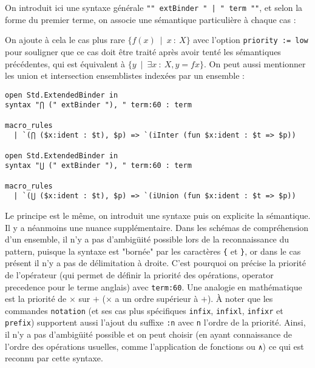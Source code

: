 \documentclass[a4paper, 12pt]{article}
\newcommand{\lean}[1]{\texttt{#1}}
\begin{document}
On introduit ici une syntaxe générale \lean{"{" extBinder " | " term "}"}, et selon la forme du premier terme, on associe une sémantique particulière à chaque cas :

On ajoute à cela le cas plus rare $\{f(x)\ \mid\ x\ :\ X\}$ avec l'option \lean{priority := low} pour souligner que ce cas doit être traité après avoir tenté les sémantiques précédentes, qui est équivalent à $\{y\ \mid\ \exists x\ :\ X, y = f x\}$. On peut aussi mentionner les union et intersection ensemblistes indexées par un ensemble :

\begin{verbatim}
open Std.ExtendedBinder in
syntax "⋂ (" extBinder "), " term:60 : term

macro_rules
  | `(⋂ ($x:ident : $t), $p) => `(iInter (fun $x:ident : $t => $p))

open Std.ExtendedBinder in
syntax "⋃ (" extBinder "), " term:60 : term

macro_rules
  | `(⋃ ($x:ident : $t), $p) => `(iUnion (fun $x:ident : $t => $p))
\end{verbatim}

Le principe est le même, on introduit une syntaxe puis on explicite la sémantique. Il y a néanmoins une nuance supplémentaire. Dans les schémas de compréhension d'un ensemble, il n'y a pas d'ambigüité possible lors de la reconnaissance du pattern, puisque la syntaxe est "bornée" par les caractères \lean{\{} et \lean{\}}, or dans le cas présent il n'y a pas de délimitation à droite. C'est pourquoi on précise la priorité de l'opérateur (qui permet de définir la priorité des opérations, operator precedence pour le terme anglais) avec \lean{term:60}. Une analogie en mathématique est la priorité de $\times$ sur $+$ ($\times$ a un ordre supérieur à $+$). À noter que les commandes \lean{notation} (et ses cas plus spécifiques \lean{infix}, \lean{infixl}, \lean{infixr} et \lean{prefix}) supportent aussi l'ajout du suffixe \lean{:n} avec \lean{n} l'ordre de la priorité. Ainsi, il n'y a pas d'ambigüité possible et on peut choisir (en ayant connaissance de l'ordre des opérations usuelles, comme l'application de fonctions ou \lean{∧}) ce qui est reconnu par cette syntaxe.
\end{document}
